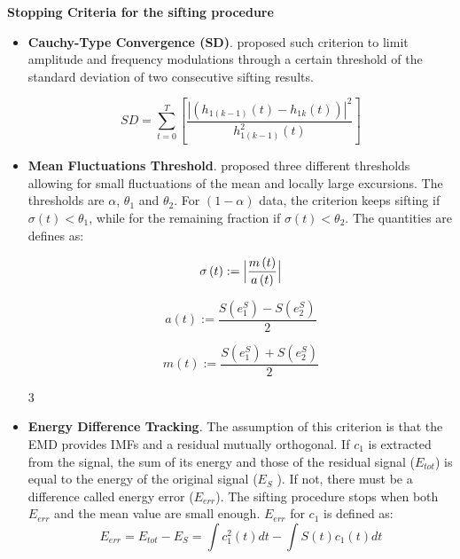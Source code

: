 \documentclass[11pt, a4paper]{article} %
\begin{document}
\textbf{Stopping Criteria for the sifting procedure}
\small

\begin{itemize}
\item \textbf{Cauchy-Type Convergence (SD)}.
\cite{Huang1998} proposed such criterion to limit amplitude and frequency modulations through a certain threshold of the standard deviation of two consecutive sifting results.

\scriptsize
\begin{equation}
SD = \sum_{t=0}^{T}\left[ \frac{|\left(h_{1\left(k-1\right)}\left(t\right)-h_{1k}\left(t\right)\right)|^2}{h_{1\left(k-1\right)}^2 \left(t\right)} \right]
\end{equation}

\small

\item \textbf{Mean Fluctuations Threshold}. 
\cite{Rilling2003} proposed three different thresholds allowing for small fluctuations of the mean and locally large excursions. The thresholds are $\alpha$, $\theta_1$ and $\theta_2$. For $\left(1-\alpha\right)$ data, the criterion keeps sifting if $\sigma\left(t\right) < \theta_1$, while for the remaining fraction if $\sigma\left(t\right) < \theta_2$. The quantities are defines as:

\scriptsize
\begin{multicols}{3}
\begin{equation*}
\sigma\left(t\right):= \Bigl| \frac{m\left(t\right)}{a\left(t\right)} \Bigr|
\end{equation*}

\begin{equation*}
a\left(t\right):= \frac{S(e_1^S)-S(e_2^S)}{2}
\end{equation*}

\begin{equation*}
m\left(t\right):= \frac{S(e_1^S)+S(e_2^S)}{2}
\end{equation*}
\end{multicols}{3}

\small

\item \textbf{Energy Difference Tracking}.
The assumption of this criterion is that the EMD provides IMFs and a residual mutually orthogonal. If $c_1$ is extracted from the signal, the sum of its energy and those of the residual signal ($E_{tot}$) is equal to the energy of the original signal ($E_S$ ). If not, there must be a difference called energy error ($E_{err}$). The sifting procedure stops when both $E_{err}$ and the mean value are small enough. $E_{err}$ for $c_1$ is defined as:
\scriptsize
\begin{equation}
E_{err} = E_{tot} - E_S = \int c_1^2(t) dt - \int S(t) c_1(t)dt
\end{equation}
\small


\end{itemize}
\end{document}
